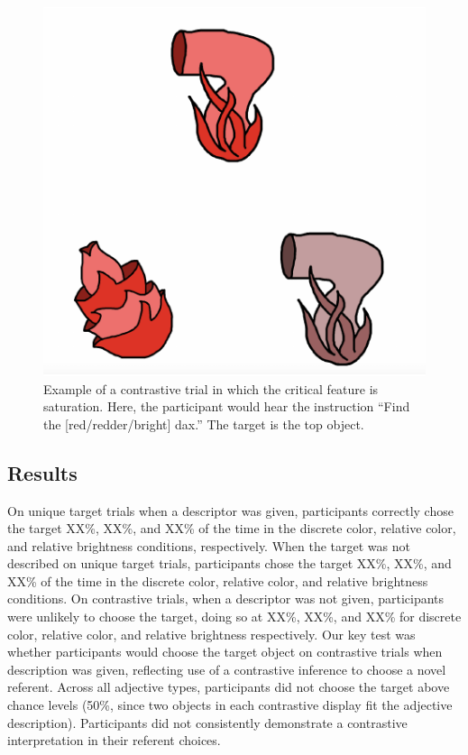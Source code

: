 \documentclass[10pt, letterpaper]{article}
\newenvironment{CodeChunk}{}{}
\begin{document}
\begin{CodeChunk}
\begin{figure}[H]

{\centering \includegraphics{figs/brightdarktrial-1} 

}

\caption[Example of a contrastive trial in which the critical feature is saturation]{Example of a contrastive trial in which the critical feature is saturation. Here, the participant would hear the instruction ``Find the [red/redder/bright] dax.'' The target is the top object.}\label{fig:brightdarktrial}
\end{figure}
\end{CodeChunk}

\hypertarget{results-1}{%
\subsection{Results}\label{results-1}}

On unique target trials when a descriptor was given, participants
correctly chose the target XX\%, XX\%, and XX\% of the time in the
discrete color, relative color, and relative brightness conditions,
respectively. When the target was not described on unique target trials,
participants chose the target XX\%, XX\%, and XX\% of the time in the
discrete color, relative color, and relative brightness conditions. On
contrastive trials, when a descriptor was not given, participants were
unlikely to choose the target, doing so at XX\%, XX\%, and XX\% for
discrete color, relative color, and relative brightness respectively.
Our key test was whether participants would choose the target object on
contrastive trials when description was given, reflecting use of a
contrastive inference to choose a novel referent. Across all adjective
types, participants did not choose the target above chance levels (50\%,
since two objects in each contrastive display fit the adjective
description). Participants did not consistently demonstrate a
contrastive interpretation in their referent choices.
\end{document}
